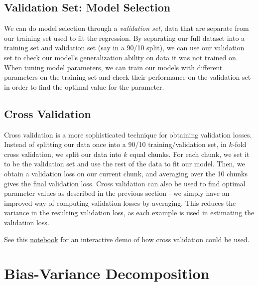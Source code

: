 \documentclass[12pt,letterpaper]{article}
\begin{document}
\vspace{0.5cm}


\subsection{Validation Set: Model Selection}

We can do model selection through a \emph{validation set}, data that are separate from our training set used to fit the regression. By separating our full dataset into a training set and validation set (say in a 90/10 split), we can use our validation set to check our model's generalization ability on data it was not trained on. When tuning model parameters, we can train our models with different parameters on the training set and check their performance on the validation set in order to find the optimal value for the parameter.

\subsection{Cross Validation}

Cross validation is a more sophisticated technique for obtaining validation losses. Instead of splitting our data once into a 90/10 training/validation set, in $k$-fold cross validation, we split our data into $k$ equal chunks. For each chunk, we set it to be the validation set and use the rest of the data to fit our model. Then, we obtain a validation loss on our current chunk, and averaging over the 10 chunks gives the final validation loss. Cross validation can also be used to find optimal parameter values as described in the previous section - we simply have an improved way of computing validation losses by averaging. This reduces the variance in the resulting validation loss, as each example is used in estimating the validation loss.

See this \href{https://colab.research.google.com/drive/1hZcd_oV8o81y3jXCHp4xpfeDOJO76MPh}{notebook} for an interactive demo of how cross validation could be used.

\section{Bias-Variance Decomposition}
\end{document}
